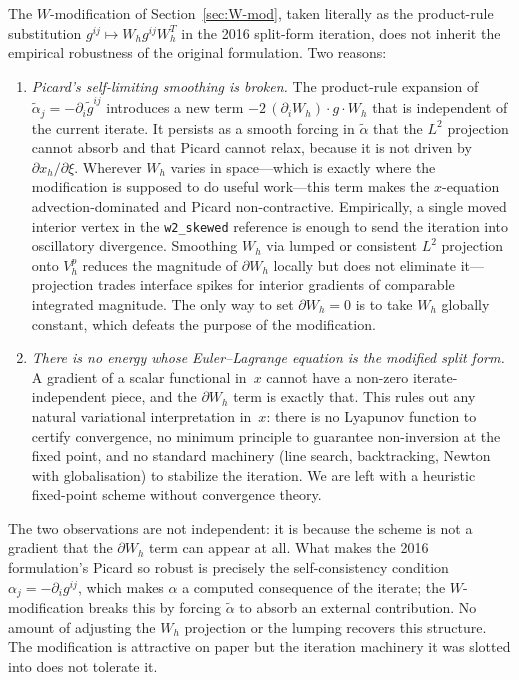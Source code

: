 \documentclass[11pt]{article}
\begin{document}
The $W$-modification of Section~\ref{sec:W-mod}, taken literally as
the product-rule substitution $g^{ij} \mapsto W_h g^{ij} W_h^T$ in
the 2016 split-form iteration, does not inherit the empirical
robustness of the original formulation. Two reasons:

\begin{enumerate}
  \item \emph{Picard's self-limiting smoothing is broken.} The
    product-rule expansion of $\tilde\alpha_j = -\partial_i
    \tilde g^{ij}$ introduces a new term $-2\,(\partial_i W_h)
    \cdot g \cdot W_h$ that is independent of the current iterate.
    It persists as a smooth forcing in $\tilde\alpha$ that the
    $L^2$ projection cannot absorb and that Picard cannot relax,
    because it is not driven by $\partial x_h / \partial \xi$.
    Wherever $W_h$ varies in space---which is exactly where the
    modification is supposed to do useful work---this term makes
    the $x$-equation advection-dominated and Picard
    non-contractive. Empirically, a single moved interior vertex
    in the \texttt{w2\_skewed} reference is enough to send the
    iteration into oscillatory divergence. Smoothing $W_h$ via
    lumped or consistent $L^2$ projection onto $V_h^p$ reduces the
    magnitude of $\partial W_h$ locally but does not eliminate
    it---projection trades interface spikes for interior gradients
    of comparable integrated magnitude. The only way to set
    $\partial W_h = 0$ is to take $W_h$ globally constant, which
    defeats the purpose of the modification.

  \item \emph{There is no energy whose Euler--Lagrange equation is
    the modified split form.} A gradient of a scalar functional
    in~$x$ cannot have a non-zero iterate-independent piece, and
    the $\partial W_h$ term is exactly that. This rules out any
    natural variational interpretation in~$x$: there is no
    Lyapunov function to certify convergence, no minimum principle
    to guarantee non-inversion at the fixed point, and no standard
    machinery (line search, backtracking, Newton with globalisation)
    to stabilize the iteration. We are left with a heuristic
    fixed-point scheme without convergence theory.
\end{enumerate}

The two observations are not independent: it is because the scheme
is not a gradient that the $\partial W_h$ term can appear at all.
What makes the 2016 formulation's Picard so robust is precisely the
self-consistency condition $\alpha_j = -\partial_i g^{ij}$, which
makes $\alpha$ a computed consequence of the iterate; the
$W$-modification breaks this by forcing $\tilde\alpha$ to absorb an
external contribution. No amount of adjusting the $W_h$ projection
or the lumping recovers this structure. The modification is
attractive on paper but the iteration machinery it was slotted into
does not tolerate it.
\end{document}
